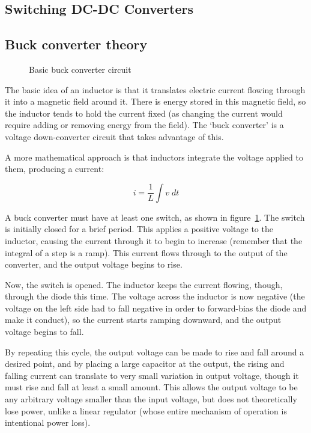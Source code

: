 \documentclass[article]{memoir}
\begin{document}
\begin{multicols}{2}
\section{Switching DC-DC Converters}
\subsection{Buck converter theory}

\begin{figure}[H]
\centering
{}
\caption{Basic buck converter circuit}
\label{fig:basicbuck}
\end{figure}

The basic idea of an inductor is that it translates electric current flowing
through it into a magnetic field around it. There is energy stored in this
magnetic field, so the inductor tends to hold the current fixed (as changing
the current would require adding or removing energy from the field). The
`buck converter' is a voltage down-converter circuit that takes advantage
of this.

A more mathematical approach is that inductors integrate the voltage applied
to them, producing a current:

\begin{equation*}
    i = \frac{1}{L} \int v\;dt
\end{equation*}

A buck converter must have at least one switch, as shown in
figure~\ref{fig:basicbuck}.  The switch is initially closed for a brief period.
This applies a positive voltage to the inductor, causing the current through it
to begin to increase (remember that the integral of a step is a ramp). This
current flows through to the output of the converter, and the output voltage
begins to rise.

Now, the switch is opened. The inductor keeps the current flowing, though,
through the diode this time. The voltage across the inductor is now negative
(the voltage on the left side had to fall negative in order to forward-bias the
diode and make it conduct), so the current starts ramping downward, and the
output voltage begins to fall.~\cite[pp.~356--357]{aoe-vreg}

By repeating this cycle, the output voltage can be made to rise and fall around
a desired point, and by placing a large capacitor at the output, the rising and
falling current can translate to very small variation in output voltage, though
it must rise and fall at least a small amount. This allows the output voltage
to be any arbitrary voltage smaller than the input voltage, but does not
theoretically lose power, unlike a linear regulator (whose entire mechanism of
operation is intentional power loss).


\end{multicols}
\end{document}
